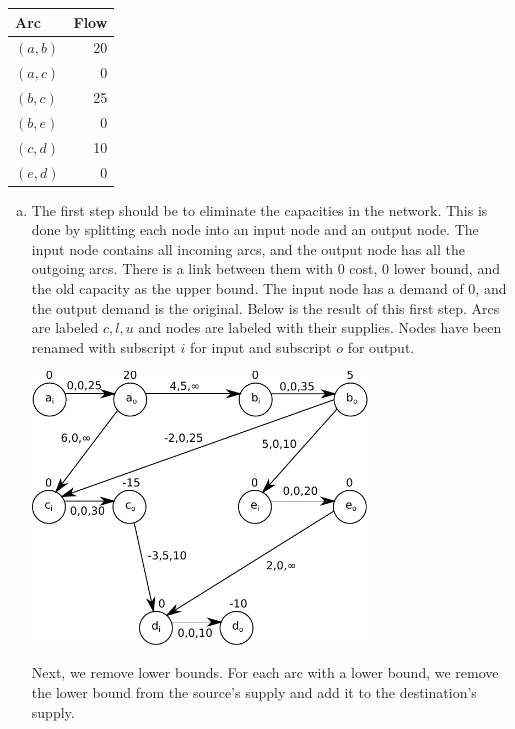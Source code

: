 \documentclass[fleqn]{homework}
\begin{document}
\begin{problem}{1}
\begin{question}
      \begin{tabular}{|l|r|}
        \hline
        Arc & Flow \\
        \hline
        $(a,b)$ & 20 \\
        $(a,c)$ & 0 \\
        $(b,c)$ & 25 \\
        $(b,e)$ & 0 \\
        $(c,d)$ & 10 \\
        $(e,d)$ & 0 \\
        \hline
      \end{tabular}
    \end{question}

    \begin{enumerate}[a.]
    \item The first step should be to eliminate the capacities in the network.
      This is done by splitting each node into an input node and an output node.
      The input node contains all incoming arcs, and the output node has all the
      outgoing arcs.  There is a link between them with 0 cost, 0 lower bound,
      and the old capacity as the upper bound.  The input node has a demand of
      0, and the output demand is the original.  Below is the result of this
      first step.  Arcs are labeled $c, l, u$ and nodes are labeled with their
      supplies.  Nodes have been renamed with subscript $i$ for input and
      subscript $o$ for output.

      \includegraphics[width=0.7\textwidth]{problem1-step1.pdf}

      Next, we remove lower bounds.  For each arc with a lower bound, we remove
      the lower bound from the source's supply and add it to the destination's
      supply.


\end{enumerate}
\end{problem}
\end{document}
